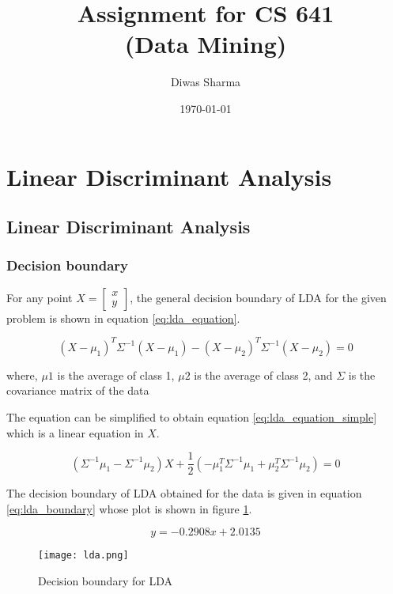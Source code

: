 \documentclass{article}
\title{Assignment for CS 641 \\ (Data Mining)}
\author{Diwas Sharma}
\date{\today}
\begin{document}
\maketitle
\newpage

\section{Linear Discriminant Analysis}

\subsection{Linear Discriminant Analysis}
\subsubsection{Decision boundary}
For any point $X = \begin{bmatrix}x \\ y\end{bmatrix}$, the general decision boundary of LDA for the given problem is shown in
equation \ref{eq:lda_equation}.

\begin{equation}
    \label{eq:lda_equation}
    (X-\mu_{1})^{T}\Sigma^{-1}(X - \mu_{1}) - (X-\mu_{2})^{T}\Sigma^{-1}(X - \mu_{2}) = 0
\end{equation}

where, $\mu{1}$ is the average of class 1,
$\mu{2}$ is the average of class 2, and
$\Sigma$ is the covariance matrix of the data

The equation can be simplified to obtain equation \ref{eq:lda_equation_simple} which is a linear
equation in $X$.

\begin{equation}
    \label{eq:lda_equation_simple}
    (\Sigma^{-1}\mu_{1} -  \Sigma^{-1}\mu_{2}) X + \frac{1}{2}(-\mu^{T}_{1}\Sigma^{-1}\mu_{1} + \mu^{T}_{2}\Sigma^{-1}\mu_{2}) = 0
\end{equation}

The decision boundary of LDA obtained for the data is given in equation \ref{eq:lda_boundary}
whose plot is shown in figure \ref{fig:lda_decision_boundary}.

\begin{equation}
    \label{eq:lda_boundary}
    y = -0.2908x + 2.0135
\end{equation}

\begin{figure}[!ht]
  \texttt{[image: lda.png]}
  \caption{Decision boundary for LDA}
  \label{fig:lda_decision_boundary}
\end{figure}
\end{document}
